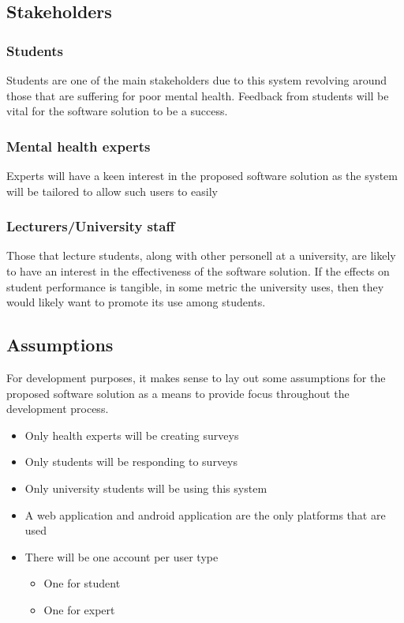 \subsection{Stakeholders}

\subsubsection*{Students}
Students are one of the main stakeholders due to this system revolving around those that are suffering for poor mental health.
Feedback from students will be vital for the software solution to be a success.

\subsubsection*{Mental health experts}
Experts will have a keen interest in the proposed software solution as the system will be tailored to allow such users to easily

\subsubsection*{Lecturers/University staff}
Those that lecture students, along with other personell at a university, are likely to have an interest in the effectiveness of the software solution.
If the effects on student performance is tangible, in some metric the university uses, then they would likely want to promote its use among students.

\subsection{Assumptions}
For development purposes, it makes sense to lay out some assumptions for the proposed software solution as a means to provide focus throughout the development process.

\begin{itemize}
    \tightlist
    \item Only health experts will be creating surveys
    \item Only students will be responding to surveys
    \item Only university students will be using this system
    \item A web application and android application are the only platforms that are used
    \item There will be one account per user type
    \begin{itemize}
        \item One for student
        \item One for expert
    \end{itemize}
\end{itemize}



